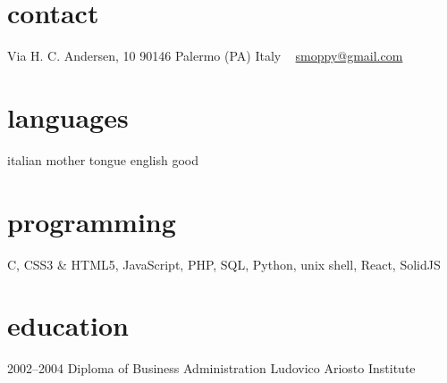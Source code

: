 \documentclass[]{friggeri-cv} %
\begin{document}


\begin{aside} %
\section{contact}
Via H. C. Andersen, 10
90146 Palermo (PA)
Italy
~
\href{mailto:smoppy@gmail.com}{smoppy@gmail.com}
\section{languages}
italian mother tongue
english good
\section{programming}
C, CSS3 \& HTML5, JavaScript, PHP, SQL, Python, unix shell, React, SolidJS
\end{aside}

\section{education}
\begin{entrylist}
\entry
{2002--2004}
{Diploma {\normalfont of Business Administration}}
{Ludovico Ariosto Institute}
{}
\end{entrylist}

\end{document}
